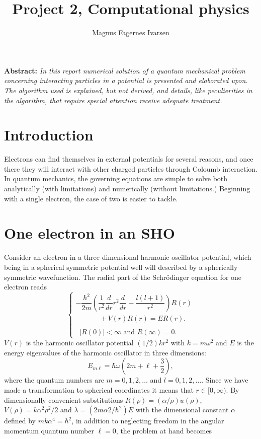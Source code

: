 \documentclass[a4paper,twocolumn,nofootinbib]{revtex4-1}
\newcommand\ECIOAbstract[1]{\noindent\textbf{Abstract:} \textit{#1}}
\begin{document}
\title{Project 2, Computational physics}
\author{Magnus Fagernes Ivarsen}
\maketitle
\ECIOAbstract{In this report numerical solution of a quantum mechanical problem concerning interacting particles in a potential is presented and elaborated upon. The algorithm used is explained, but not derived, and details, like peculierities in the algorithm, that require special attention receive adequate treatment.}

\section*{Introduction}
Electrons can find themselves in external potentials for several reasons, and once there they will interact with other charged particles through Coloumb interaction. In quantum mechanics, the governing equations are simple to solve both analytically (with limitations) and numerically (without limitations.) Beginning with a single electron, the case of two is easier to tackle.
\section*{One electron in an SHO}
Consider an electron in a three-dimensional harmonic
oscillator potential, which being in a spherical symmetric potential well will described by a spherically symmetric wavefunction. The radial part of the Schr\"odinger equation for one electron reads
\[
\begin{cases}
  -\dfrac{\hbar^2}{2 m} \left ( \dfrac{1}{r^2} \dfrac{d}{dr} r^2
  \dfrac{d}{dr} - \dfrac{l (l + 1)}{r^2} \right )R(r) \\
    \;\;\;\;\;\;\;\;\;\;\;\; + V(r) R(r) = E R(r).\\ 
     \\
     \;\; |R(0)| < \infty \text{ and } R(\infty) = 0.
\end{cases}
\]
$V(r)$ is the harmonic oscillator potential $(1/2)kr^2$ with
$k=m\omega^2$ and $E$ is
the energy eigenvalues of the harmonic oscillator in three dimensions:
\[
E_{m\ell}=  \hbar \omega \left(2m+\ell+\frac{3}{2}\right),
\]
where the quantum numbers are $m=0,1,2,\dots$ and $l=0,1,2,\dots$.
Since we have made a transformation to spherical coordinates it means that 
$r\in [0,\infty)$.  
By dimensionally convenient substitutions $R(\rho) = (\alpha/\rho) u(\rho)$, $V(\rho)=k\alpha^2\rho^2/2$ and $\lambda=(2m\alpha 2/\hbar^2)E$ with the dimensional constant $\alpha$ defined by $mk\alpha^4=\hbar^2$, in addition to neglecting freedom in the angular momentum quantum number $\ell=0$, the problem at hand becomes
\end{document}
